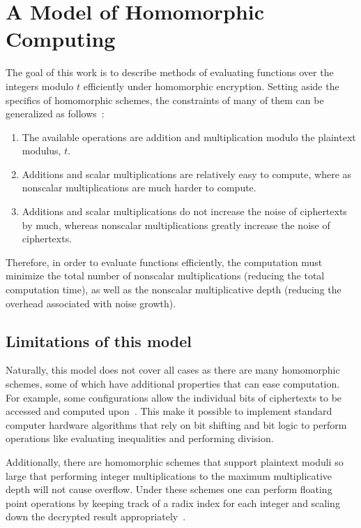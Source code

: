 \documentclass{article}
\begin{document}
    \section{A Model of Homomorphic Computing}
    \label{desc}

    The goal of this work
    is to describe methods of evaluating functions over the integers modulo $t$ efficiently under homomorphic encryption.
    Setting aside the specifics of homomorphic schemes, 
    the constraints of many of them can be generalized as follows~\cite{homenc,yashe,somewhat,firstImp,smaller,integers,faster,shorter,lwe,depth,leveled,gapsvp}:
    \begin{enumerate}[1.]
        \item
            The available operations are addition and multiplication modulo the plaintext modulus, $t$.
        \item
            Additions and scalar multiplications are relatively easy to compute, where as nonscalar multiplications are much harder to compute. 
        \item
            Additions and scalar multiplications do not increase the noise of ciphertexts by much, whereas nonscalar multiplications greatly increase the noise of ciphertexts.
    \end{enumerate}

    Therefore, in order to evaluate functions efficiently, the computation must minimize
    the total number of nonscalar multiplications (reducing the total computation time),
    as well as the nonscalar multiplicative depth (reducing the overhead associated with noise growth).

    \subsection{Limitations of this model}
        Naturally, this model does not cover all cases as there are many homomorphic schemes,
        some of which have additional properties that can ease computation.
        For example, some configurations allow the individual bits of ciphertexts to be
        accessed and computed upon~\cite{aes,newton,genomic}.
        This make
        it possible to implement standard computer hardware algorithms that rely on bit shifting and bit logic to perform operations like evaluating inequalities and performing division.

        Additionally, there are homomorphic schemes that support plaintext moduli so large that performing integer multiplications to the maximum multiplicative depth will not cause overflow.
        Under these schemes one can perform floating point operations by keeping track of a radix index for each integer and scaling down the decrypted result appropriately~\cite{newton,fixedpoint}.
        
\end{document}
